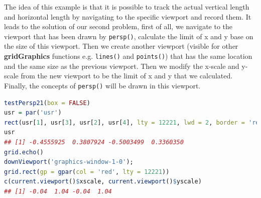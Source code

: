 \documentclass[11pt,twoside]{report}
\begin{document}
\newpage
The idea of this example is that it is possible to track the actual vertical length and horizontal length by navigating to the specific viewport and record them. It leads to the solution of our second problem, first of all, we navigate to the viewport that has been drawn by \texttt{persp()}, calculate the limit of x and y base on the size of this viewport. Then we create another viewport (visible for other \textbf{gridGraphics} functions e.g. \texttt{lines()} and \texttt{points()}) that has the same location and the same size as the previous viewport. Then we modify the x-scale and y-scale from the new viewport to be the limit of x and y that we calculated. Finally, the concepts of \texttt{persp()} will be drawn in this viewport. \\

\begin{lstlisting}[language = R]
testPersp21(box = FALSE)
usr = par('usr')
rect(usr[1], usr[3], usr[2], usr[4], lty = 12221, lwd = 2, border = 'red')
usr
## [1] -0.4555925  0.3807924 -0.5003499  0.3360350
grid.echo()
downViewport('graphics-window-1-0'); 
grid.rect(gp = gpar(col = 'red', lty = 12221))
c(current.viewport()$xscale, current.viewport()$yscale)
## [1] -0.04  1.04 -0.04  1.04
\end{lstlisting}
\end{document}
